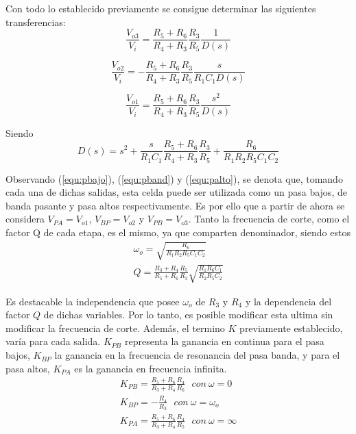 Con todo lo establecido previamente se consigue determinar las siguientes transferencias:
\begin{equation}
	\frac{V_{o3}}{V_{i}} = \frac{R_5 + R_6}{R_4 + R_3} \frac{R_3}{R_5} \frac{1}{D(s)}
	\label{equ:pbajo}
\end{equation}

\begin{equation}
	\frac{V_{o2}}{V_{i}} = -\frac{R_5 + R_6}{R_4 + R_3} \frac{R_3}{R_5} \frac{s}{R_1 C_1 D(s)}
	\label{equ:pband}
\end{equation}

\begin{equation}
	\frac{V_{o1}}{V_{i}} = \frac{R_5 + R_6}{R_4 + R_3} \frac{R_3}{R_5} \frac{s^2}{D(s)}
	\label{equ:palto}
\end{equation}

Siendo
\begin{equation}
	D(s) = s^2 + \frac{s}{R_1 C_1} \frac{R_5 + R_6}{R_4 + R_3} \frac{R_3}{R_5} + \frac{R_6}{R_1 R_2 R_5 C_1 C_2}
\end{equation}

Observando (\ref{equ:pbajo}), (\ref{equ:pband}) y (\ref{equ:palto}), se denota que, tomando cada una de dichas salidas, esta celda puede ser utilizada como un pasa bajos, de banda pasante y pasa altos respectivamente. Es por ello que a partir de ahora se considera $V_{PA} = V_{o1}$, $V_{BP} = V_{o2}$ y $V_{PB} = V_{o3}$. Tanto la frecuencia de corte, como el factor Q de cada etapa, es el mismo, ya que comparten denominador, siendo estos
\begin{equation}
\begin{split}
	\omega_o = \sqrt{\frac{R_6}{R_1 R_2 R_5 C_1 C_2}} \\
	Q = \frac{R_3 + R_4}{R_5 + R_6} \frac{R_5}{R_3} \sqrt{\frac{R_1 R_6 C_1}{R_2 R_5 C_2}} 
\end{split}
\end{equation}

Es destacable la independencia que posee $\omega_o$ de $R_3$ y $R_4$ y la dependencia del factor $Q$ de dichas variables. Por lo tanto, es posible modificar esta ultima sin modificar la frecuencia de corte. Además, el termino $K$ previamente establecido, varía para cada salida. $K_{PB}$ representa la ganancia en continua para el pasa bajos, $K_{BP}$ la ganancia en la frecuencia de resonancia del pasa banda, y para el pasa altos, $K_{PA}$ es la ganancia en frecuencia infinita.
\begin{equation}
\begin{split}
	K_{PB} = \frac{R_5 + R_6}{R_3 + R_4} \frac{R_4}{R_6}	\	\	\ con \ \omega = 0 \\
	K_{BP} = -\frac{R_4}{R_3}	\	\	\ con \ \omega = \omega_o \\
	K_{PA} = \frac{R_5 + R_6}{R_3 + R_4} \frac{R_4}{R_5}	\	\	\ con \ \omega = \infty	
\end{split}
\end{equation}

